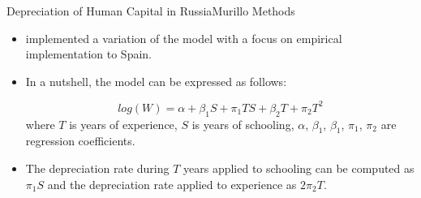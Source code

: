 \documentclass{beamer}
\begin{document}
\begin{frame}{Depreciation of Human Capital in Russia}{Murillo Methods}
\begin{itemize}
	\item \citet{murillo_172._2006} implemented a variation of the \citet{neuman_091._1995} model with a focus on
	empirical implementation to Spain.
	\item In a nutshell, the model can be expressed as follows:
	
	\begin{equation}
	log(W) = \alpha +  \beta_{1}S + \pi_{1}TS + \beta_{2}T + \pi_{2}T^{2} 
	\end{equation}
	where $T$ is years of experience, $S$ is years of schooling, $\alpha$, $\beta_{1}$, $\beta_{1}$, $\pi_{1}$, $\pi_{2}$ are regression coefficients.
	\vspace{2pt}
	\item The depreciation rate during $T$ years applied to schooling can be computed as $\pi_{1}S $ and the depreciation rate applied to experience as $ 2\pi_{2}T$.
\end{itemize}
\end{frame}

\end{document}

